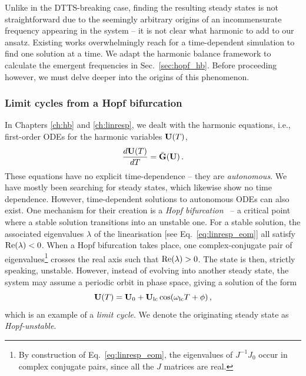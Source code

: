 Unlike in the DTTS-breaking case, finding the resulting steady states is not straightforward due to the seemingly arbitrary origins of an incommensurate frequency appearing in the system -- it is not clear what harmonic to add to our ansatz. Existing works overwhelmingly reach for a time-dependent simulation to find one solution at a time. We adapt the harmonic balance framework to calculate the emergent frequencies in Sec.~\ref{sec:hopf_hb}. Before proceeding however, we must delve deeper into the origins of this phenomenon. 

\subsubsection{Limit cycles from a Hopf bifurcation}

In Chapters \ref{ch:hb} and \ref{ch:linresp}, we dealt with the harmonic equations, i.e., first-order ODEs for the harmonic variables $\vb{U}(T)$,
\begin{equation}
\frac{d\vb{U}(T)}{dT}  = \bar{\vb{G}} (\vb{U})\,.
\end{equation}
These equations have no explicit time-dependence -- they are \textit{autonomous}. We have mostly been searching for steady states, which likewise show no time dependence. However, time-dependent solutions to autonomous ODEs can also exist. One mechanism for their creation is a \textit{Hopf bifurcation}~\cite{Jordan_Smith, Strogatz} -- a critical point where a stable solution transitions into an unstable one. For a stable solution, the associated eigenvalues $\lambda$ of the linearisation [see Eq.~\eqref{eq:linresp_eom}] all satisfy $\text{Re} (\lambda) < 0$. When a Hopf bifurcation takes place, one complex-conjugate pair of eigenvalues\footnote{By construction of Eq.~\eqref{eq:linresp_eom}, the eigenvalues of $J^{-1} J_0$ occur in complex conjugate pairs, since all the $J$ matrices are real.} crosses the real axis such that $\text{Re} (\lambda) > 0$. The state is then, strictly speaking, unstable. However, instead of evolving into another steady state, the system may assume a periodic orbit in phase space, giving a solution of the form 
\begin{equation} \label{eq:hopf_hopf}
\vb{U}(T) = \vb{U}_0 + \vb{U}_{\rm lc} \cos(\omega_{\rm lc} T + \phi ) \,,
\end{equation}
which is an example of a \textit{limit cycle}. We denote the originating steady state as \textit{Hopf-unstable}. 

